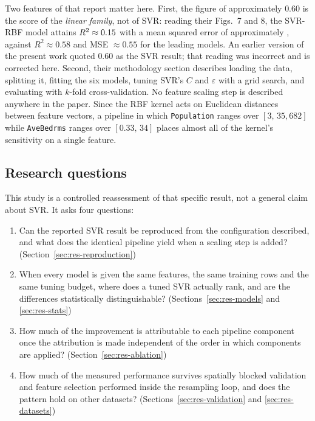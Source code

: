 \documentclass[pdflatex,sn-mathphys-num]{sn-jnl}
\begin{document}
Two features of that report matter here. First, the figure of approximately $0.60$ is the score of the \emph{linear family}, not of SVR: reading their Figs.~7 and 8, the SVR-RBF model attains $R^2 \approx 0.15$ with a mean squared error of approximately \PreethiReportedMSE{}, against $R^2 \approx 0.58$ and MSE $\approx 0.55$ for the leading models. An earlier version of the present work quoted $0.60$ as the SVR result; that reading was incorrect and is corrected here. Second, their methodology section describes loading the data, splitting it, fitting the six models, tuning SVR's $C$ and $\varepsilon$ with a grid search, and evaluating with $k$-fold cross-validation. No feature scaling step is described anywhere in the paper. Since the RBF kernel acts on Euclidean distances between feature vectors, a pipeline in which \texttt{Population} ranges over $[3,\,35{,}682]$ while \texttt{AveBedrms} ranges over $[0.33,\,34]$ places almost all of the kernel's sensitivity on a single feature.

\subsection{Research questions}\label{sec:questions}
This study is a controlled reassessment of that specific result, not a general claim about SVR. It asks four questions:

\begin{enumerate}
\item[Q1] Can the reported SVR result be reproduced from the configuration described, and what does the identical pipeline yield when a scaling step is added? (Section~\ref{sec:res-reproduction})
\item[Q2] When every model is given the same features, the same training rows and the same tuning budget, where does a tuned SVR actually rank, and are the differences statistically distinguishable? (Sections~\ref{sec:res-models} and \ref{sec:res-stats})
\item[Q3] How much of the improvement is attributable to each pipeline component once the attribution is made independent of the order in which components are applied? (Section~\ref{sec:res-ablation})
\item[Q4] How much of the measured performance survives spatially blocked validation and feature selection performed inside the resampling loop, and does the pattern hold on other datasets? (Sections~\ref{sec:res-validation} and \ref{sec:res-datasets})
\end{enumerate}
\end{document}
